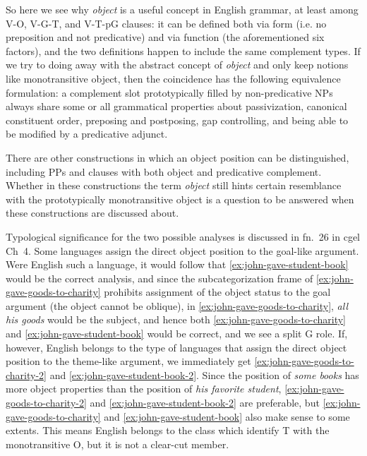 \documentclass[UTF8, a4paper, oneside, scheme=plain, 12pt]{ctexbook}
\newcommand*{\citechap}[1]{Ch~{#1}}
\newcommand*{\citefootnote}[1]{fn.~{#1}}
\newcommand*{\term}[1]{\emph{#1}}
\newcommand{\form}[1]{\emph{#1}}
\begin{document}
So here we see why \term{object} is a useful concept in English grammar,
at least among V-O, V-G-T, and V-T-pG clauses:
it can be defined both via form (i.e. no preposition and not predicative)
and via function (the aforementioned six factors),
and the two definitions happen to include the same complement types.
If we try to doing away with the abstract concept of \term{object}
and only keep notions like monotransitive object,
then the coincidence has the following equivalence formulation:
a complement slot prototypically filled by non-predicative NPs
always share some or all grammatical properties
about passivization, canonical constituent order,
preposing and postposing, gap controlling, 
and being able to be modified by a predicative adjunct. 

There are other constructions in which an object position can be distinguished,
including PPs and clauses with both object and predicative complement. %
Whether in these constructions the term \term{object} still hints 
certain resemblance with the prototypically monotransitive object 
is a question to be answered when these constructions are discussed about.


Typological significance for the two possible analyses is discussed in
\citefootnote{26} in \ac{cgel} \citechap{4}.
Some languages assign the direct object position to the goal-like argument.
Were English such a language, 
it would follow that \eqref{ex:john-gave-student-book} would be the correct analysis,
and since the subcategorization frame of \eqref{ex:john-gave-goods-to-charity} 
prohibits assignment of the object status to the goal argument
(the object cannot be oblique),
in \eqref{ex:john-gave-goods-to-charity},
\form{all his goods} would be the subject,
and hence both \eqref{ex:john-gave-goods-to-charity} and \eqref{ex:john-gave-student-book} 
would be correct,
and we see a split G role.
If, however, English belongs to the type of languages 
that assign the direct object position to the theme-like argument,
we immediately get \eqref{ex:john-gave-goods-to-charity-2} and \eqref{ex:john-gave-student-book-2}.
Since the position of \form{some books} has more object properties 
than the position of \form{his favorite student},
\eqref{ex:john-gave-goods-to-charity-2} and \eqref{ex:john-gave-student-book-2} are preferable,
but \eqref{ex:john-gave-goods-to-charity} and \eqref{ex:john-gave-student-book} also make sense 
to some extents.
This means English belongs to the class which identify T with the monotransitive O, 
but it is not a clear-cut member.
\end{document}
